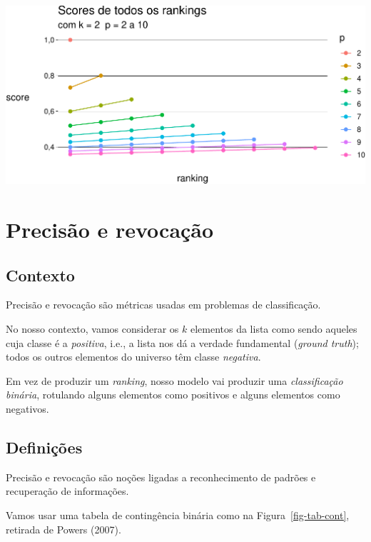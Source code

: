 \documentclass[
  letterpaper,
  DIV=11,
  numbers=noendperiod]{scrreprt}
\begin{document}
\begin{center}
\includegraphics[width=1\textwidth,height=\textheight]{usando-posicoes_files/figure-pdf/unnamed-chunk-14-1.pdf}
\end{center}


\chapter{Precisão e revocação}\label{precisuxe3o-e-revocauxe7uxe3o}

\section{Contexto}\label{contexto}

Precisão e revocação são métricas usadas em problemas de classificação.

No nosso contexto, vamos considerar os $k$ elementos da lista como sendo
aqueles cuja classe é a \emph{positiva}, i.e., a lista nos dá a verdade
fundamental (\emph{ground truth}); todos os outros elementos do universo
têm classe \emph{negativa}.

Em vez de produzir um \emph{ranking}, nosso modelo vai produzir uma
\emph{classificação binária}, rotulando alguns elementos como positivos
e alguns elementos como negativos.

\section{Definições}\label{definiuxe7uxf5es}

Precisão e revocação são noções ligadas a reconhecimento de padrões e
recuperação de informações.

Vamos usar uma tabela de contingência binária como na
Figura~\ref{fig-tab-cont}, retirada de Powers (2007).
\end{document}
